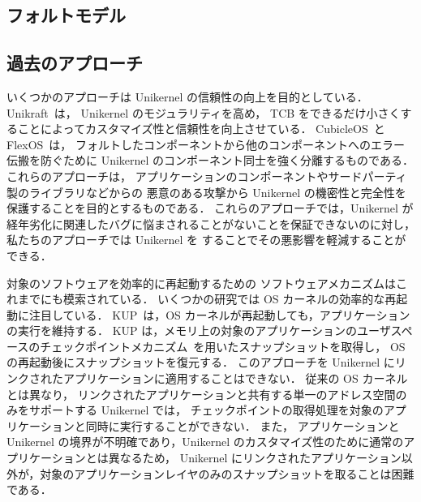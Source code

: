 \subsection{\rr}

\subsection{フォルトモデル}

\subsection{過去のアプローチ}

いくつかのアプローチは Unikernel の信頼性の向上を目的としている．
Unikraft~\cite{KuenzerEtAl-Unikraft}は，
Unikernel のモジュラリティを高め，
TCB をできるだけ小さくすることによってカスタマイズ性と信頼性を向上させている．
CubicleOS~\cite{SartakovEtAl-ASPLOS21}と FlexOS~\cite{LefeuvreEtAl-FlexOS}は，
フォルトしたコンポーネントから他のコンポーネントへのエラー伝搬を防ぐために
Unikernel のコンポーネント同士を強く分離するものである．
これらのアプローチは，
アプリケーションのコンポーネントやサードパーティ製のライブラリなどからの
悪意のある攻撃から Unikernel の機密性と完全性を保護することを目的とするものである．
これらのアプローチでは，Unikernel が経年劣化に関連したバグに悩まされることがないことを保証できないのに対し，
私たちのアプローチでは Unikernel を \rr することでその悪影響を軽減することができる．


対象のソフトウェアを効率的に再起動するための
ソフトウェアメカニズムはこれまでにも模索されている．
いくつかの研究では OS カーネルの効率的な再起動に注目している．
KUP~\cite{KashyapEtAl-KUP}は，OS カーネルが再起動しても，アプリケーションの実行を維持する．
KUP は，メモリ上の対象のアプリケーションのユーザスペースのチェックポイントメカニズム~\cite{CRIU}を用いたスナップショットを取得し，
OS の再起動後にスナップショットを復元する．
このアプローチを Unikernel にリンクされたアプリケーションに適用することはできない．
従来の OS カーネルとは異なり，
リンクされたアプリケーションと共有する単一のアドレス空間のみをサポートする Unikernel では，
チェックポイントの取得処理を対象のアプリケーションと同時に実行することができない．
また，
アプリケーションと Unikernel の境界が不明確であり，Unikernel のカスタマイズ性のために通常のアプリケーションとは異なるため，
Unikernel にリンクされたアプリケーション以外が，対象のアプリケーションレイヤのみのスナップショットを取ることは困難である．


